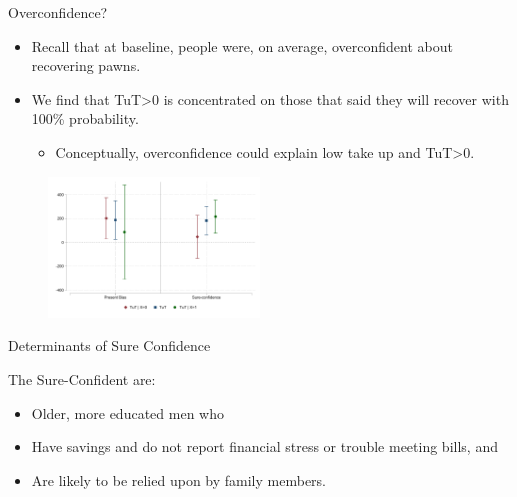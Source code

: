\documentclass[9pt, aspectratio=169]{beamer}
\begin{document}



\begin{frame}{Overconfidence?}

\begin{itemize}
    \item   Recall that at baseline, people were, on average, overconfident about recovering pawns.
    \vfill \item We find that TuT>0 is concentrated on those that said they will recover with 100\% probability. 
    \begin{itemize}
        \item Conceptually, overconfidence could explain low take up and TuT>0.
    \end{itemize}
\end{itemize}
\begin{figure}[H]
        \includegraphics[width=0.5\textwidth]{Figuras/tut_beh_partition.pdf}
\end{figure}
\end{frame}


\begin{frame}{Determinants of Sure Confidence}

The Sure-Confident are:
\begin{itemize}
    \item   Older, more educated men who
    \item   Have savings and do not report financial stress or trouble meeting bills, and 
    \item   Are likely to be relied upon by family members.
\end{itemize}        
\end{frame}
\end{document}
